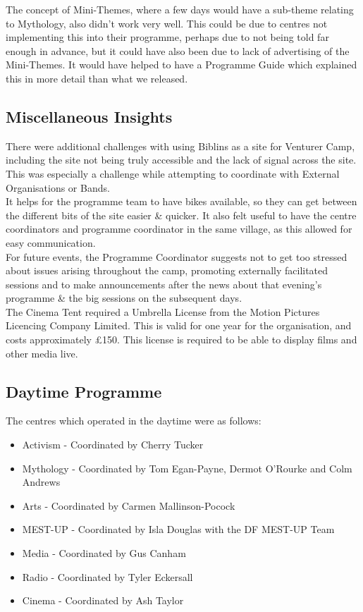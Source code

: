 The concept of Mini-Themes, where a few days would have a sub-theme relating to Mythology, also didn't work very well. This could be due to centres not implementing this into their programme, perhaps due to not being told far enough in advance, but it could have also been due to lack of advertising of the Mini-Themes. It would have helped to have a Programme Guide which explained this in more detail than what we released.

\subsection{Miscellaneous Insights}
There were additional challenges with using Biblins as a site for Venturer Camp, including the site not being truly accessible and the lack of signal across the site. This was especially a challenge while attempting to coordinate with External Organisations or Bands.\\

It helps for the programme team to have bikes available, so they can get between the different bits of the site easier \& quicker. It also felt useful to have the centre coordinators and programme coordinator in the same village, as this allowed for easy communication. \\

For future events, the Programme Coordinator suggests not to get too stressed about issues arising throughout the camp, promoting externally facilitated sessions and to make announcements after the news about that evening's programme \& the big sessions on the subsequent days. \\

The Cinema Tent required a Umbrella License from the Motion Pictures Licencing Company Limited. This is valid for one year for the organisation, and costs approximately £150. This license is required to be able to display films and other media live.

\subsection{Daytime Programme}
The centres which operated in the daytime were as follows:
\begin{itemize}
    \item Activism - Coordinated by Cherry Tucker
    \item Mythology - Coordinated by Tom Egan-Payne, Dermot O'Rourke and Colm Andrews
    \item Arts - Coordinated by Carmen Mallinson-Pocock
    \item MEST-UP - Coordinated by Isla Douglas with the DF MEST-UP Team
    \item Media - Coordinated by Gus Canham
    \item Radio - Coordinated by Tyler Eckersall
    \item Cinema - Coordinated by Ash Taylor
\end{itemize}

